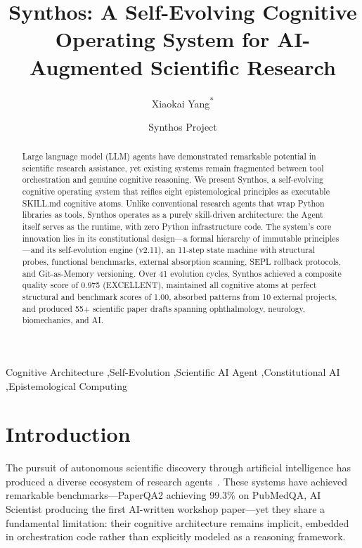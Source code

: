 \documentclass[review]{elsarticle}
\begin{document}
\begin{frontmatter}

\title{Synthos: A Self-Evolving Cognitive Operating System for AI-Augmented Scientific Research}

\author[1]{Xiaokai Yang\textsuperscript{*}}
\author[2]{Synthos Project}
\address[1]{Department of Neurology, Wenzhou People's Hospital, Wenzhou 325000, China}
\address[2]{GitHub: \url{https://github.com/yakeworld/Synthos}}

\begin{abstract}
Large language model (LLM) agents have demonstrated remarkable potential in scientific research assistance, yet existing systems remain fragmented between tool orchestration and genuine cognitive reasoning. We present Synthos, a self-evolving cognitive operating system that reifies eight epistemological principles as executable SKILL.md cognitive atoms. Unlike conventional research agents that wrap Python libraries as tools, Synthos operates as a purely skill-driven architecture: the Agent itself serves as the runtime, with zero Python infrastructure code. The system's core innovation lies in its constitutional design---a formal hierarchy of immutable principles---and its self-evolution engine (v2.11), an 11-step state machine with structural probes, functional benchmarks, external absorption scanning, SEPL rollback protocols, and Git-as-Memory versioning. Over 41 evolution cycles, Synthos achieved a composite quality score of 0.975 (EXCELLENT), maintained all cognitive atoms at perfect structural and benchmark scores of 1.00, absorbed patterns from 10 external projects, and produced 55+ scientific paper drafts spanning ophthalmology, neurology, biomechanics, and AI.
\end{abstract}

\begin{keyword}
Cognitive Architecture \sep Self-Evolution \sep Scientific AI Agent \sep Constitutional AI \sep Epistemological Computing
\end{keyword}
\end{frontmatter}

\section{Introduction}

The pursuit of autonomous scientific discovery through artificial intelligence has produced a diverse ecosystem of research agents~\cite{elovic2024gpt,sakana2025ai,shao2024storm,futurehouse2025paperqa2,asai2025openscholar}. These systems have achieved remarkable benchmarks---PaperQA2 achieving 99.3\% on PubMedQA, AI Scientist producing the first AI-written workshop paper---yet they share a fundamental limitation: their cognitive architecture remains implicit, embedded in orchestration code rather than explicitly modeled as a reasoning framework.
\end{document}
